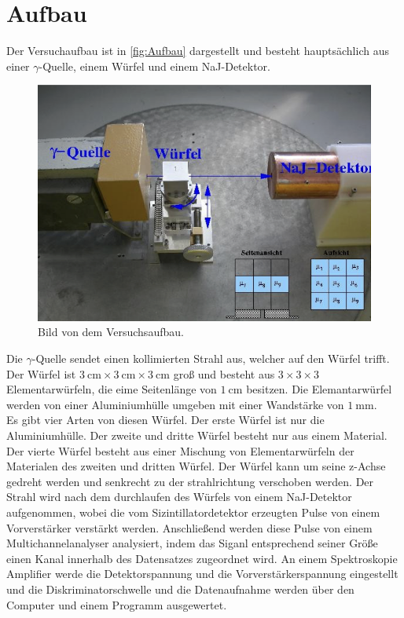 \section{Aufbau}
\label{sec:Aufbau}
Der Versuchaufbau ist in \autoref{fig:Aufbau} dargestellt und besteht hauptsächlich aus einer $\gamma$-Quelle, einem Würfel und einem NaJ-Detektor.
\begin{figure}[H]
    \centering
    \includegraphics[scale=0.7]{Abbildungen/Aufbau.png}
    \caption{Bild von dem Versuchsaufbau.\cite{V14}}
    \label{fig:Doppelbrechung}
\end{figure}
Die $\gamma$-Quelle sendet einen kollimierten Strahl aus, welcher auf den Würfel trifft. 
Der Würfel ist $\qty{3}{\centi\meter} \times \qty{3}{\centi\meter} \times \qty{3}{\centi\meter}$ groß und besteht aus $3 \times 3 \times 3$ Elementarwürfeln, die eime Seitenlänge
von $\qty{1}{\centi\meter}$ besitzen. Die Elemantarwürfel werden von einer Aluminiumhülle umgeben mit einer Wandstärke von $\qty{1}{\milli\meter}$.\\
Es gibt vier Arten von diesen Würfel. Der erste Würfel ist nur die Aluminiumhülle. Der zweite und dritte Würfel besteht nur aus einem Material. Der vierte Würfel besteht aus
einer Mischung von Elementarwürfeln der Materialen des zweiten und dritten Würfel.
Der Würfel kann um seine z-Achse gedreht werden und senkrecht zu der strahlrichtung verschoben werden.
Der Strahl wird nach dem durchlaufen des Würfels von einem NaJ-Detektor aufgenommen, wobei die vom Sizintillatordetektor erzeugten Pulse von einem Vorverstärker verstärkt werden.
Anschließend werden diese Pulse von einem Multichannelanalyser analysiert, indem das Siganl entsprechend seiner Größe einen Kanal innerhalb des Datensatzes zugeordnet wird.
An einem Spektroskopie Amplifier werde die Detektorspannung und die Vorverstärkerspannung eingestellt und die Diskriminatorschwelle und die Datenaufnahme werden über den Computer und einem 
Programm ausgewertet.


